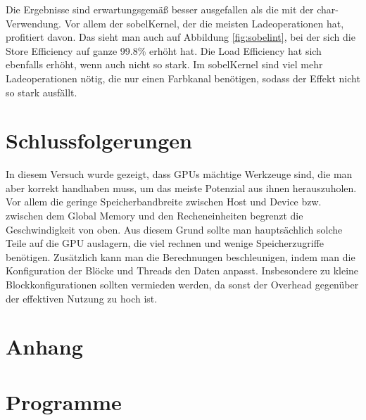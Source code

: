 \documentclass[12pt,a4paper]{scrartcl}
\begin{document}
Die Ergebnisse sind erwartungsgem\"a\ss{} besser ausgefallen als die mit der char-Verwendung.
Vor allem der sobelKernel, der die meisten Ladeoperationen hat, profitiert davon.
Das sieht man auch auf Abbildung \ref{fig:sobelint}, bei der sich die Store Efficiency auf ganze 99.8\% erh\"oht hat.
Die Load Efficiency hat sich ebenfalls erh\"oht, wenn auch nicht so stark.
Im sobelKernel sind viel mehr Ladeoperationen n\"otig, die nur einen Farbkanal ben\"otigen, sodass der Effekt nicht so stark ausf\"allt.


\section{Schlussfolgerungen}
In diesem Versuch wurde gezeigt, dass GPUs m\"achtige Werkzeuge sind, die man aber korrekt handhaben muss, um das meiste Potenzial aus ihnen herauszuholen.
Vor allem die geringe Speicherbandbreite zwischen Host und Device bzw. zwischen dem Global Memory und den Recheneinheiten begrenzt die Geschwindigkeit von oben.
Aus diesem Grund sollte man haupts\"achlich solche Teile auf die GPU auslagern, die viel rechnen und wenige Speicherzugriffe ben\"otigen.
Zus\"atzlich kann man die Berechnungen beschleunigen, indem man die Konfiguration der Bl\"ocke und Threads den Daten anpasst.
Insbesondere zu kleine Blockkonfigurationen sollten vermieden werden, da sonst der Overhead gegen\"uber der effektiven Nutzung zu hoch ist.

\newpage
\section{Anhang}
\appendix
\label{anhang}

\section{Programme}
 \newpage
 \newpage
 \newpage
 \newpage
 \newpage
 \newpage

\end{document}
